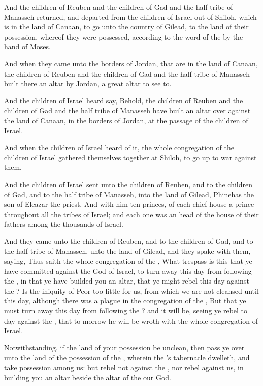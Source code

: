 \verse And the children of Reuben and the children of Gad and the half tribe of Manasseh returned, and departed from the children of Israel out of Shiloh, which is in the land of Canaan, to go unto the country of Gilead, to the land of their possession, whereof they were possessed, according to the word of the \LORD by the hand of Moses.

\verse And when they came unto the borders of Jordan, that are in the land of Canaan, the children of Reuben and the children of Gad and the half tribe of Manasseh built there an altar by Jordan, a great altar to see to.

\verse And the children of Israel heard say, Behold, the children of Reuben and the children of Gad and the half tribe of Manasseh have built an altar over against the land of Canaan, in the borders of Jordan, at the passage of the children of Israel.

\verse And when the children of Israel heard of it, the whole congregation of the children of Israel gathered themselves together at Shiloh, to go up to war against them.

\verse And the children of Israel sent unto the children of Reuben, and to the children of Gad, and to the half tribe of Manasseh, into the land of Gilead, Phinehas the son of Eleazar the priest, \verse And with him ten princes, of each chief house a prince throughout all the tribes of Israel; and each one was an head of the house of their fathers among the thousands of Israel.

\verse And they came unto the children of Reuben, and to the children of Gad, and to the half tribe of Manasseh, unto the land of Gilead, and they spake with them, saying, \verse Thus saith the whole congregation of the \LORD, What trespass is this that ye have committed against the God of Israel, to turn away this day from following the \LORD, in that ye have builded you an altar, that ye might rebel this day against the \LORD?  \verse Is the iniquity of Peor too little for us, from which we are not cleansed until this day, although there was a plague in the congregation of the \LORD, \verse But that ye must turn away this day from following the \LORD? and it will be, seeing ye rebel to day against the \LORD, that to morrow he will be wroth with the whole congregation of Israel.

\verse Notwithstanding, if the land of your possession be unclean, then pass ye over unto the land of the possession of the \LORD, wherein the \LORD's tabernacle dwelleth, and take possession among us: but rebel not against the \LORD, nor rebel against us, in building you an altar beside the altar of the \LORD our God.


